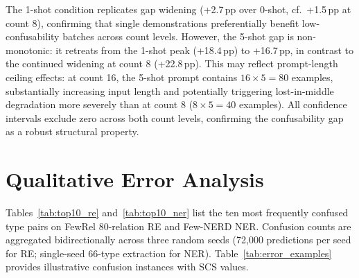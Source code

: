 \documentclass[11pt]{article}
\begin{document}
The 1-shot condition replicates gap widening (+2.7\,pp over 0-shot, cf.\ +1.5\,pp at count 8), confirming that single demonstrations preferentially benefit low-confusability batches across count levels. However, the 5-shot gap is non-monotonic: it retreats from the 1-shot peak (+18.4\,pp) to +16.7\,pp, in contrast to the continued widening at count 8 (+22.8\,pp). This may reflect prompt-length ceiling effects: at count 16, the 5-shot prompt contains $16 \times 5 = 80$ examples, substantially increasing input length and potentially triggering lost-in-middle degradation \citep{lost-in-middle-2024} more severely than at count 8 ($8 \times 5 = 40$ examples). All confidence intervals exclude zero across both count levels, confirming the confusability gap as a robust structural property.

\section{Qualitative Error Analysis}
\label{app:error-analysis}

Tables~\ref{tab:top10_re} and~\ref{tab:top10_ner} list the ten most frequently confused type pairs on FewRel 80-relation RE and Few-NERD NER. Confusion counts are aggregated bidirectionally across three random seeds (72{,}000 predictions per seed for RE; single-seed 66-type extraction for NER). Table~\ref{tab:error_examples} provides illustrative confusion instances with SCS values.
\end{document}
